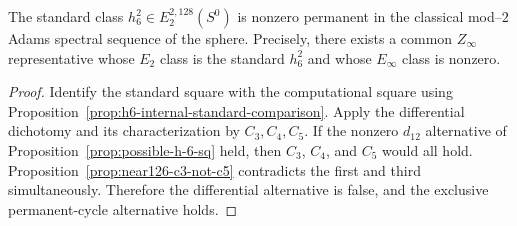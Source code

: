 \begin{theorem}
  \label{thm:h6-square-permanent}
  \notready
  The standard class $h_6^2\in E_2^{2,128}(S^0)$ is nonzero permanent
  in the classical mod--$2$ Adams spectral sequence of the sphere.
  Precisely, there exists a common $Z_\infty$ representative whose
  $E_2$ class is the standard $h_6^2$ and whose $E_\infty$ class is nonzero.
\end{theorem}

\begin{proof}
  Identify the standard square with the computational square using
  Proposition~\ref{prop:h6-internal-standard-comparison}. Apply the
  differential dichotomy and its characterization by $C_3,C_4,C_5$.
  If the nonzero
  $d_{12}$ alternative of
  Proposition~\ref{prop:possible-h-6-sq} held, then $C_3$, $C_4$, and $C_5$ would
  all hold.  Proposition~\ref{prop:near126-c3-not-c5} contradicts the first and
  third simultaneously.  Therefore the differential alternative is false,
  and the exclusive permanent-cycle alternative holds.
\end{proof}
